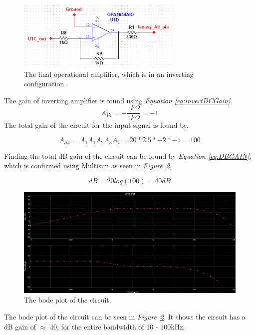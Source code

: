 \begin{figure}[h]
    \centering
    \includegraphics[width=0.70\textwidth]{graphics/OPamp4.png}
    \caption{The final operational amplifier, which is in an inverting configuration.}
    \label{fig:Opamp4}
\end{figure}

The gain of inverting amplifier is found using \textit{Equation \ref{eq:invertDCGain}}.
$$ A_{V4} = -\frac{1k \Omega}{1k \Omega} = -1$$
The total gain of the circuit for the input signal is found by.

$$A_{tot} = A_1A_1A_2A_3A_4 = 20*2.5*-2*-1 = 100$$

Finding the total dB gain of the circuit can be found by \textit{Equation \ref{eq:DBGAIN}}, which is confirmed using Multisim as seen in \textit{Figure~\ref{fig:bode}}.

$$dB = 20log(100) = 40dB$$


\begin{figure}[h]
    \centering
    \includegraphics[width=1.0\textwidth]{graphics/bodeNew.png}
    \caption{The bode plot of the circuit.}
    \label{fig:bode}
\end{figure}

The bode plot of the circuit can be seen in \textit{Figure~\ref{fig:bode}}.
It shows the circuit has a dB gain of $\approx$ 40, for the entire bandwidth of 10 - 100kHz.



